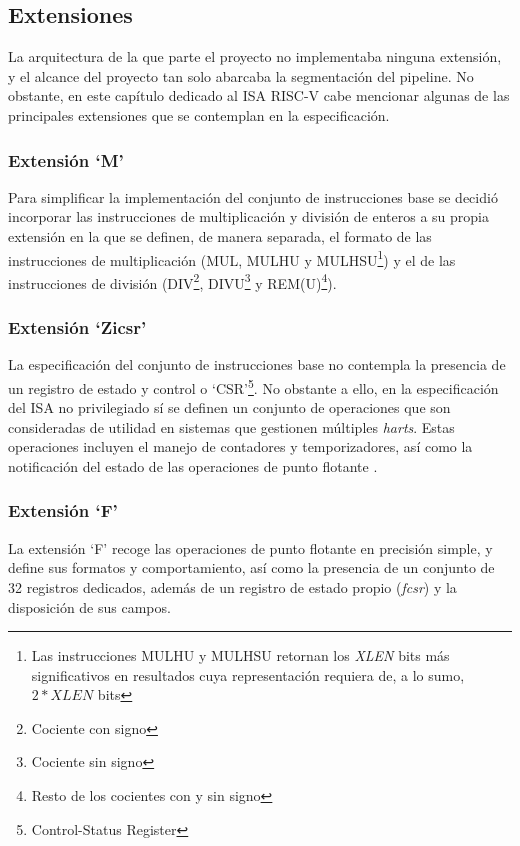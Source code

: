 \subsection{Extensiones}

La arquitectura de la que parte el proyecto no implementaba ninguna extensión, y el alcance del proyecto tan solo abarcaba la segmentación del pipeline. No obstante, en este capítulo dedicado al ISA RISC-V cabe mencionar algunas de las principales extensiones que se contemplan en la especificación.

\subsubsection{Extensión `M'}

Para simplificar la implementación del conjunto de instrucciones base se decidió incorporar las instrucciones de multiplicación y división de enteros a su propia extensión en la que se definen, de manera separada, el formato de las instrucciones de multiplicación (MUL, MULHU y MULHSU\footnote{Las instrucciones MULHU y MULHSU retornan los \textit{XLEN} bits más significativos en resultados cuya representación requiera de, a lo sumo, \(2 * XLEN\) bits}) y el de las instrucciones de división (DIV\footnote{Cociente con signo}, DIVU\footnote{Cociente sin signo} y REM(U)\footnote{Resto de los cocientes con y sin signo}).

\subsubsection{Extensión `Zicsr'}

La especificación del conjunto de instrucciones base no contempla la presencia de un registro de estado y control o `CSR'\footnote{Control-Status Register}. No obstante a ello, en la especificación del ISA no privilegiado sí se definen un conjunto de operaciones que son consideradas de utilidad en sistemas que gestionen múltiples \textit{harts}. Estas operaciones incluyen el manejo de contadores y temporizadores, así como la notificación del estado de las operaciones de punto flotante \cite{riscv-unpriv-isa-20250508-zicsr}.

\subsubsection{Extensión `F'}

La extensión `F' recoge las operaciones de punto flotante en precisión simple, y define sus formatos y comportamiento, así como la presencia de un conjunto de 32 registros dedicados, además de un registro de estado propio (\textit{fcsr}) y la disposición de sus campos.

